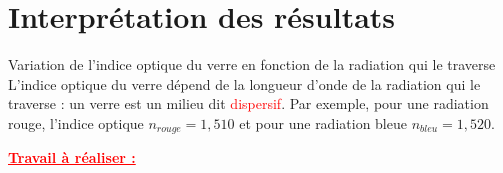 
\section{Interprétation des résultats}

\begin{doc}{Variation de l'indice optique du verre en fonction de la radiation qui le traverse}
    L'indice optique du verre dépend de la longueur d'onde de la radiation qui le traverse : un verre est un milieu dit \textcolor{red}{dispersif}. Par exemple, pour une radiation rouge, l'indice optique $n_{rouge}=1,510$ et pour une radiation bleue $n_{bleu}=1,520$.
\end{doc}
\begin{large}
    \textbf{\textcolor{red}{\underline{Travail à réaliser :}}}
\end{large}
\\
